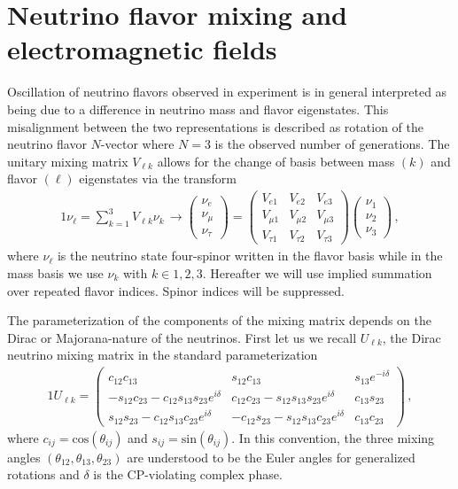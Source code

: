 \documentclass[addchapnum]{ws-rv961x669} %
\begin{document}
\section{Neutrino flavor mixing and electromagnetic fields}
\label{sec:nuflavor}
Oscillation of neutrino flavors observed in experiment is in general interpreted as being due to a difference in neutrino mass and flavor eigenstates. This misalignment between the two representations is described as rotation of the neutrino flavor $N$-vector where $N=3$ is the observed number of generations. The unitary mixing matrix $V_{\ell k}$ allows for the change of basis between mass $(k)$ and flavor $(\ell)$ eigenstates via the transform 
\begin{alignat}{1}
\label{basis:1} \nu_{\ell}=\sum_{k=1}^{3}V_{\ell k}\nu_{k}\,\rightarrow
\begin{pmatrix}
\nu_{e}\\
\nu_{\mu}\\
\nu_{\tau}
\end{pmatrix}=
\begin{pmatrix}
V_{e1} & V_{e2} & V_{e3}\\
V_{\mu1} & V_{\mu2} & V_{\mu3}\\
V_{\tau1} & V_{\tau2} & V_{\tau3}
\end{pmatrix}
\begin{pmatrix}
\nu_{1}\\
\nu_{2}\\
\nu_{3}
\end{pmatrix}\,,
\end{alignat}
where $\nu_{\ell}$ is the neutrino state four-spinor written in the flavor basis while in the mass basis we use $\nu_{k}$ with $k\in1,2,3$. Hereafter we will use implied summation over repeated flavor indices. Spinor indices will be suppressed.

The parameterization of the components of the mixing matrix depends on the Dirac or Majorana-nature of the neutrinos. First let us we recall $U_{\ell k}$, the Dirac neutrino mixing matrix in the standard parameterization~\citep{Schwartz:2014sze} 
\begin{alignat}{1}
\label{rotation:1} U_{\ell k} =
\begin{pmatrix}
 c_{12}c_{13} & s_{12}c_{13} & s_{13}e^{-i\delta}\\
 -s_{12}c_{23} - c_{12}s_{13}s_{23}e^{i\delta} & c_{12}c_{23} - s_{12}s_{13}s_{23}e^{i\delta} & c_{13}s_{23}\\
 s_{12}s_{23} - c_{12}s_{13}c_{23}e^{i\delta}& -c_{12}s_{23} - s_{12}s_{13}c_{23}e^{i\delta} & c_{13}c_{23}
\end{pmatrix}\,,
\end{alignat}
where $c_{ij} = \mathrm{cos}(\theta_{ij})$ and $s_{ij} = \mathrm{sin}(\theta_{ij})$. In this convention, the three mixing angles $(\theta_{12}, \theta_{13}, \theta_{23})$ are understood to be the Euler angles for generalized rotations and $\delta$ is the CP-violating complex phase. 
\end{document}
